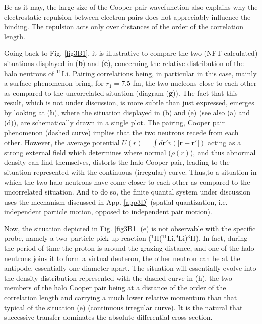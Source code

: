 \begin{subappendices}
         
Be as it may, the large size of the Cooper pair wavefunction also explains why the electrostatic repulsion between electron pairs does not appreciably influence the binding. The repulsion acts only over distances of the order of the correlation length. 

Going back to Fig. \ref{fig3B1}, it is illustrative to compare the two (NFT calculated) situations displayed in (\textbf{b}) and (\textbf{e}), concerning the relative distribution of the halo neutrons of $^{11}$Li. Pairing correlations being, in particular in this case, mainly a surface phenomenon bring, for $r_1=7.5$ fm, the two nucleons close to each other as compared to the uncorrelated situation (diagram (\textbf{g})). The fact that this result, which is not under discussion, is more subtle than just expressed, emerges by looking at (\textbf{h}), where the situation displayed in (b) and (e) (see also (a) and (d)), are schematically drawn in a single plot.
The pairing, Cooper pair phenomenon (dashed curve) implies that the two neutrons recede from each other. However, the average potential $U(r)=\int  d\mathbf r' v(|\mathbf r-\mathbf r'|)$ acting as a strong external field which determines where normal ($\rho(r)$), and thus abnormal density can find themselves, distorts the halo Cooper pair, leading to the situation represented with the continuous (irregular) curve. Thus,to a situation in which the two halo neutrons have come closer to each other as compared to the uncorrelated situation. And to do so, the finite quantal system under discussion uses the mechanism discussed in App. \ref{app3D} (spatial quantization, i.e. independent particle motion, opposed to independent pair motion).


Now, the situation depicted in Fig. \ref{fig3B1} (e) is not observable with the specific probe, namely a two--particle pick up reaction ($^1$H($^{11}$Li,$^9$Li)$^3$H). In fact, during the period of time the proton is around the grazing distance, and one of the halo neutrons joins it to form a virtual deuteron, the other neutron can be at the antipode, essentially one diameter apart. The situation will essentially evolve into the density distribution represented with the dashed curve in (h), the two members of the halo Cooper pair being at a distance of the order of the correlation length and carrying a much lower relative momentum than that typical of the situation (e) (continuous irregular curve). It is the natural that successive transfer dominates the absolute differential cross section.


\end{subappendices}
